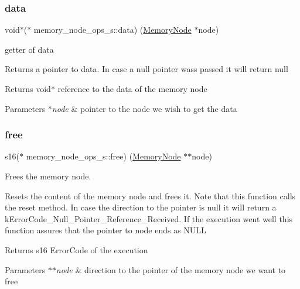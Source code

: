 \subsubsection{\texorpdfstring{data}{data}}
{\footnotesize\ttfamily void$\ast$($\ast$ memory\+\_\+node\+\_\+ops\+\_\+s\+::data) (\hyperlink{structmemory__node__s}{Memory\+Node} $\ast$node)}



getter of data 

Returns a pointer to data. In case a null pointer wass passed it will return null

\begin{DoxyReturn}{Returns}
void$\ast$ reference to the data of the memory node 
\end{DoxyReturn}

\begin{DoxyParams}{Parameters}
{\em $\ast$node} & pointer to the node we wish to get the data \\
\hline
\end{DoxyParams}
\mbox{\label{structmemory__node__ops__s_a80866224e48d132a253baccc3543dda3}} 
\subsubsection{\texorpdfstring{free}{free}}
{\footnotesize\ttfamily s16($\ast$ memory\+\_\+node\+\_\+ops\+\_\+s\+::free) (\hyperlink{structmemory__node__s}{Memory\+Node} $\ast$$\ast$node)}



Frees the memory node. 

Resets the content of the memory node and frees it. Note that this function calls the reset method. In case the direction to the pointer is null it will return a k\+Error\+Code\+\_\+\+Null\+\_\+\+Pointer\+\_\+\+Reference\+\_\+\+Received. If the execution went well this function assures that the pointer to node ends as N\+U\+LL

\begin{DoxyReturn}{Returns}
s16 Error\+Code of the execution 
\end{DoxyReturn}

\begin{DoxyParams}{Parameters}
{\em $\ast$$\ast$node} & direction to the pointer of the memory node we want to free \\
\hline
\end{DoxyParams}
\mbox{\label{structmemory__node__ops__s_a9b50f77455ae67d99ce92e9fde94ae93}} 
